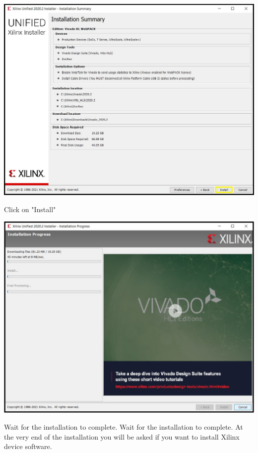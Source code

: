 \includegraphics[width=\linewidth]{images/VivadoInstimg016.jpg}

Click on "Install"

\includegraphics[width=\linewidth]{images/VivadoInstimg017.jpg}

Wait for the installation to complete. Wait for the installation to complete. At the very end of the installation you will be asked if you want
to install Xilinx device software.

